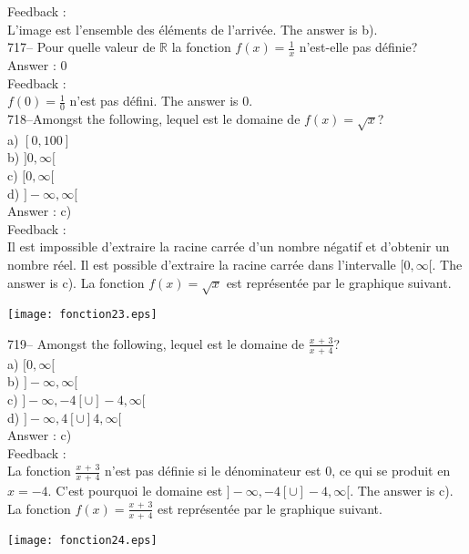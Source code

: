 \documentclass[letterpaper, 12pt]{article}
\begin{document}
Feedback : \\
L'image est l'ensemble des \'el\'ements de l'arriv\'ee.  The answer is
b).\\

717-- Pour quelle valeur de $\mathbb{R}$ la fonction $f(x)=\frac{1}{x}$
n'est-elle pas d\'efinie?\\

Answer : 0\\

Feedback :\\
$f(0)=\frac{1}{0}$ n'est pas d\'efini.  The answer is 0.\\

718--Amongst the following, lequel est le domaine de
$f(x)=\sqrt{x}$?\\
a) $[0,100]$\\
b) $]0,\infty[$\\
c) $[0,\infty[$\\
d) $]-\infty, \infty[$\\

Answer : c)\\

Feedback : \\
Il est impossible d'extraire la racine carr\'ee d'un nombre n\'egatif et
d'obtenir un nombre r\'eel.  Il est possible d'extraire la racine carr\'ee
dans l'intervalle $[0,\infty[$.  The answer is c).  La fonction
$f(x)=\sqrt{x}$ est repr\'esent\'ee par le graphique suivant.\\
    \begin{center}
    \texttt{[image: fonction23.eps]}
    \end{center}


719-- Amongst the following, lequel est le domaine de
$\frac{x\,+\,3}{x\,+\,4}$?\\
a) $[0,\infty[$\\
b) $]-\infty, \infty[$\\
c) $]-\infty,-4[ \cup ]-4,\infty[$\\
d) $]-\infty,4[ \cup ]4,\infty[$\\

Answer : c)\\

Feedback :\\
La fonction $\frac{x\,+\,3}{x\,+\,4}$ n'est pas d\'efinie si le
d\'enominateur est 0, ce qui se produit en $x=-4$.  C'est pourquoi le
domaine est $]-\infty,-4[ \cup ]-4,\infty[$.  The answer is c).  La
fonction $f(x)=\frac{x\,+\,3}{x\,+\,4}$ est repr\'esent\'ee par le graphique
suivant.\\
    \begin{center}
    \texttt{[image: fonction24.eps]}
    \end{center}
\end{document}
